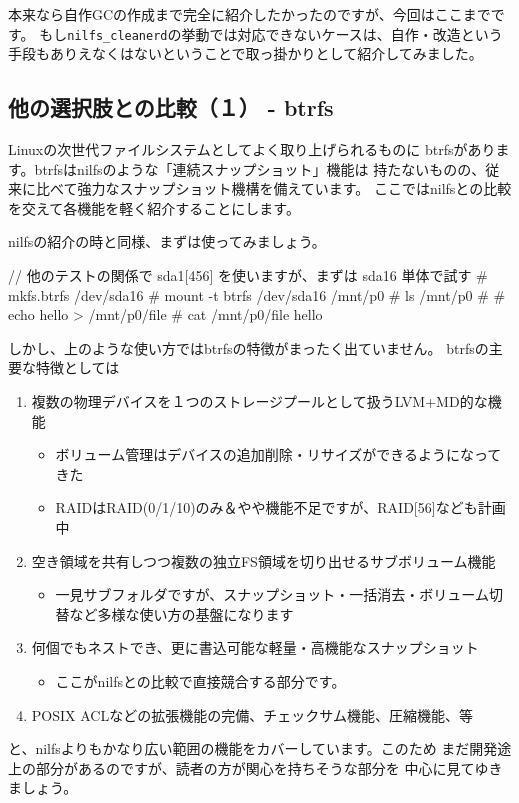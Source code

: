 \documentclass[mingoth,a4paper]{jsarticle}
\begin{document}
本来なら自作GCの作成まで完全に紹介したかったのですが、今回はここまでです。
もし\verb|nilfs_cleanerd|の挙動では対応できないケースは、自作・改造という
手段もありえなくはないということで取っ掛かりとして紹介してみました。

\subsection{他の選択肢との比較（１） - btrfs}

Linuxの次世代ファイルシステムとしてよく取り上げられるものに
btrfsがあります。btrfsはnilfsのような「連続スナップショット」機能は
持たないものの、従来に比べて強力なスナップショット機構を備えています。
ここではnilfsとの比較を交えて各機能を軽く紹介することにします。

nilfsの紹介の時と同様、まずは使ってみましょう。

\begin{commandline}
// 他のテストの関係で sda1[456] を使いますが、まずは sda16 単体で試す
# mkfs.btrfs /dev/sda16
# mount -t btrfs /dev/sda16 /mnt/p0
# ls /mnt/p0
#
# echo hello > /mnt/p0/file
# cat /mnt/p0/file
hello
\end{commandline}

しかし、上のような使い方ではbtrfsの特徴がまったく出ていません。
btrfsの主要な特徴としては
\begin{enumerate}
\item 複数の物理デバイスを１つのストレージプールとして扱うLVM+MD的な機能
\begin{itemize}
\item ボリューム管理はデバイスの追加削除・リサイズができるようになってきた
\item RAIDはRAID(0/1/10)のみ＆やや機能不足ですが、RAID[56]なども計画中
\end{itemize}
\item 空き領域を共有しつつ複数の独立FS領域を切り出せるサブボリューム機能
\begin{itemize}
\item 一見サブフォルダですが、スナップショット・一括消去・ボリューム切替など多様な使い方の基盤になります
\end{itemize}
\item 何個でもネストでき、更に書込可能な軽量・高機能なスナップショット
\begin{itemize}
\item ここがnilfsとの比較で直接競合する部分です。
\end{itemize}
\item POSIX ACLなどの拡張機能の完備、チェックサム機能、圧縮機能、等
\end{enumerate}
と、nilfsよりもかなり広い範囲の機能をカバーしています。このため
まだ開発途上の部分があるのですが、読者の方が関心を持ちそうな部分を
中心に見てゆきましょう。
\end{document}
